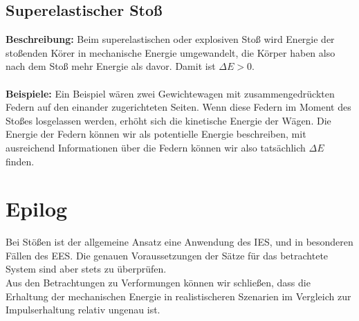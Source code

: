 \documentclass[11pt]{article}
\begin{document}
\subsection{Superelastischer Stoß}
\textbf{Beschreibung:} Beim superelastischen oder explosiven Stoß wird Energie der stoßenden Körer in mechanische Energie umgewandelt, die Körper haben also nach dem Stoß mehr Energie als davor. Damit ist $\Delta E > 0$. \\\\
\textbf{Beispiele:} Ein Beispiel wären zwei Gewichtewagen mit zusammengedrückten Federn auf den einander zugerichteten Seiten. Wenn diese Federn im Moment des Stoßes losgelassen werden, erhöht sich die kinetische Energie der Wägen. Die Energie der Federn können wir als potentielle Energie beschreiben, mit ausreichend Informationen über die Federn können wir also tatsächlich $\Delta E$ finden. 



\section{Epilog}
Bei Stößen ist der allgemeine Ansatz eine Anwendung des IES, und in besonderen Fällen des EES. Die genauen Voraussetzungen der Sätze für das betrachtete System sind aber stets zu überprüfen. \\ 
Aus den Betrachtungen zu Verformungen können wir schließen, dass die Erhaltung der mechanischen Energie in realistischeren Szenarien im Vergleich zur Impulserhaltung relativ ungenau ist.
\end{document}
